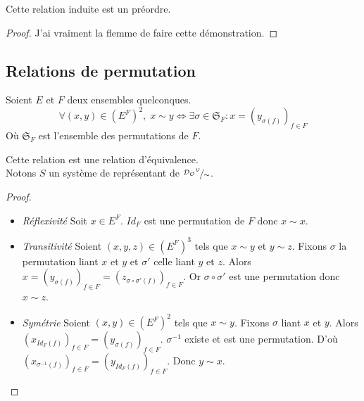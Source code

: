 \begin{proposition}
	Cette relation induite est un préordre.
\end{proposition}

\begin{proof}
	J'ai vraiment la flemme de faire cette démonstration.
\end{proof}


\subsection{Relations de permutation}

\begin{definition}
	Soient $E$ et $F$ deux ensembles quelconques.
	\begin{equation}
		\forall \left(x,y\right) \in \left(E^F\right)^2\!, \;
		x \sim y \iff
		\exists \sigma \in \mathfrak{S}_F : x = \left(y_{\sigma(f)}\right)_{f \in F}
	\end{equation}
	Où $\mathfrak{S}_F$ est l'ensemble des permutations de $F$. \\
\end{definition}

\begin{proposition}
	Cette relation est une relation d'équivalence. \\
	Notons $S$ un système de représentant de $\nicefrac{{\mathcal{D}_\mathcal{O}}^{\mathcal{V}}}{\sim}$.
\end{proposition}

\begin{proof}
	~\newline
	\begin{itemize}
		\item \textit{Réflexivité} Soit $x \in E^F$. $Id_F$ est une permutation de $F$ donc $x \sim x$.
		\item \textit{Transitivité} Soient $(x, y, z) \in \left(E^F\right)^3$ tels que $x \sim y$ et $y \sim z$.
		Fixons $\sigma$ la permutation liant $x$ et $y$ et $\sigma'$ celle liant $y$ et $z$.
		Alors $x = \left(y_{\sigma(f)}\right)_{f \in F} = \left(z_{\sigma \circ \sigma'(f)}\right)_{f \in F}$.
		Or $\sigma \circ \sigma'$ est une permutation donc $x \sim z$.
		\item \textit{Symétrie} Soient $(x, y) \in \left(E^F\right)^2$ tels que $x \sim y$.
		Fixons $\sigma$ liant $x$ et $y$. Alors $\left(x_{Id_F(f)}\right)_{f \in F} = \left(y_{\sigma(f)}\right)_{f \in F}$.
		$\sigma^{-1}$ existe et est une permutation. D'où $\left(x_{\sigma^{-1}(f)}\right)_{f \in F} = \left(y_{Id_F(f)}\right)_{f \in F}$. Donc $y \sim x$.
	\end{itemize}
\end{proof}

